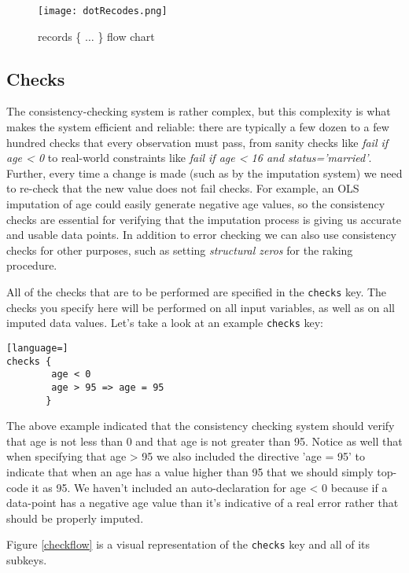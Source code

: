 \documentclass{article}
\begin{document}
\begin{figure}
\begin{center}
\texttt{[image: dotRecodes.png]}
\caption{records \{ $\ldots$ \} flow chart}\label{recodefigure}
\end{center}
\end{figure}

\subsection{Checks}
The consistency-checking system is rather complex, but this complexity is what 
makes the system efficient and reliable: there are typically a
few dozen to a few hundred checks that every observation must pass, from sanity checks
like {\em fail if age < 0} to real-world constraints like {\em fail if age < 16 and
status='married'}. Further, every time a change is made (such as by the imputation system)
we need to re-check that the new value does not fail checks. For example, an OLS imputation of age
could easily generate negative age values, so the consistency checks are essential
for verifying that the imputation process is giving us accurate and usable data points. In addition 
to error checking we can also use consistency checks for other purposes, such as setting 
{\em structural zeros} for the raking procedure.

All of the checks that are to be performed are specified in the {\tt checks} key. 
The checks you specify here will be performed on all input variables, as well as on all 
imputed data values. Let's take a look at an example {\tt checks} key:

\begin{lstlisting}[language=]
checks {
    	age < 0
        age > 95 => age = 95
       }
\end{lstlisting}

The above example indicated that the consistency checking system should verify that
age is not less than 0 and that age is not greater than 95. Notice as well that when
specifying that age > 95 we also included the directive 'age = 95' to indicate that when
an age has a value higher than 95 that we should simply top-code it as 95. We haven't
included an auto-declaration for age < 0 because if a data-point has a negative age
value than it's indicative of a real error rather that should be properly imputed.

Figure \ref{checkflow} is a visual representation of the {\tt checks} key and all of its subkeys.
\end{document}
